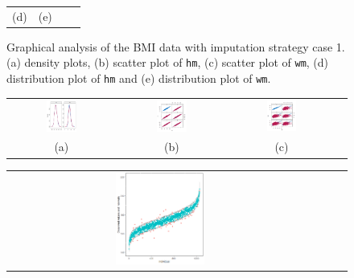 \begin{figure} [ht!]
\begin{tabular}{cccc}
			\textnormal{(d)}  & \textnormal{(e)}  \\[6pt]
		\end{tabular}
		\caption{Graphical analysis of the BMI data with imputation strategy case 1. (a) density plots, (b) scatter plot of \texttt{hm}, (c) scatter plot of \texttt{wm}, (d) distribution plot of \texttt{hm} and (e) distribution plot of \texttt{wm}.}
		\label{fig6_9}
	\end{figure}
	
	
	\begin{figure} [ht!]
		\centering
		\begin{tabular}{cccc}
			\includegraphics[width=0.3\textwidth]{plots/densitycase2} &
			\includegraphics[width=0.3\textwidth]{plots/scattercase2hm} &
			\includegraphics[width=0.3\textwidth]{plots/scattercase2wm} \\
			\textnormal{(a)}  & \textnormal{(b)} & \textnormal{(c)}  \\[6pt]
		\end{tabular}
		\begin{tabular}{cccc}
			\includegraphics[width=0.3\textwidth]{plots/distributioncase2hm} &

\end{tabular}
\end{figure}
